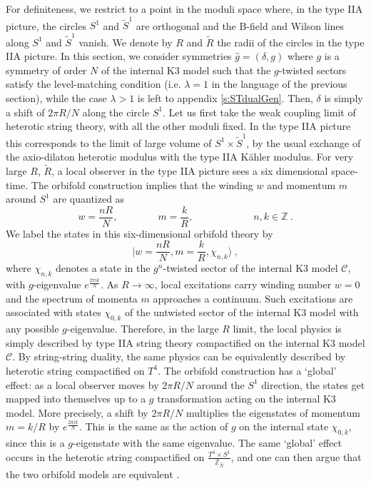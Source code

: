 \documentclass[a4paper,11pt]{article}
\newcommand{\ZZ}{\mathbb{Z}}
\newcommand{\C}{\mathcal{C}}
\numberwithin{equation}{section}
\def\be{\begin{equation}}
\def\ee{\end{equation}}
\begin{document}
 For definiteness, we restrict to a point in the moduli space where, in the type IIA picture, the circles $S^1$ and $\tilde S^1$ are orthogonal and the B-field and Wilson lines along $S^1$ and $\tilde S^1$ vanish. We denote by $R$ and $\tilde R$ the radii of the circles in the type IIA picture. In this section, we consider  symmetries $\hat g=(\delta,g)$ where  $g$ is a symmetry of order $N$ of the internal K3 model such that the $g$-twisted sectors satisfy the level-matching condition (i.e. $\lambda=1$ in the language of the previous section), while the case $\lambda>1$ is left to appendix \ref{s:STdualGen}. Then, $\delta$ is simply a shift of $2\pi R/N$ along the circle $S^1$. Let us first take the weak coupling limit of heterotic string theory, with all the other moduli fixed. In the type IIA picture this corresponds to the limit of large volume of $S^1\times \tilde S^1$, by the usual exchange of the axio-dilaton heterotic modulus with the type IIA K\"ahler modulus.  For very large $R$, $\tilde R$, a local observer in the type IIA picture sees a six dimensional space-time. The orbifold construction implies that the winding $w$  and momentum $m$ around $S^1$  are quantized as 
\be w=\frac{nR}{N},\qquad \qquad m=\frac{k}{R},\qquad  \qquad\qquad n,k\in\ZZ\ .
\ee  We label the states in this six-dimensional orbifold theory by
\be |w=\frac{nR}{N},m=\frac{k}{R},\chi_{n,k}\rangle\ ,
\ee where $\chi_{n,k}$ denotes a state  in the $g^n$-twisted sector of the internal K3 model $\C$, with $g$-eigenvalue $e^{\frac{2\pi i k}{N}}$.
As $R\to \infty$, local excitations carry winding number $w=0$ and the spectrum of momenta $m$ approaches a continuum. Such excitations are associated with states $\chi_{0,k}$ of the untwisted sector of the internal K3 model with any possible $g$-eigenvalue. Therefore, in the large $R$ limit, the local physics is simply described by type IIA string theory compactified on the internal K3 model $\C$. By string-string duality, the same physics can be equivalently described by heterotic string compactified on $T^4$. The orbifold construction has a `global' effect: as a local observer moves by $2\pi R/N$ around the $S^1$ direction, the states get mapped into themselves up to a $g$ transformation acting on the internal K3 model. More precisely, a shift by $2\pi R/N$ multiplies the eigenstates of momentum $m=k/R$ by $e^{\frac{2\pi ik}{N}}$. This is the same as the action of $g$ on the internal state $\chi_{0,k}$, since this is a $g$-eigenstate with the same eigenvalue. The same `global' effect occurs in the heterotic string compactified on $\frac{T^4\times S^1}{\ZZ_{\hat N}}$, and one can then argue that the two orbifold models are equivalent \cite{VafaWitten95}.
\end{document}
